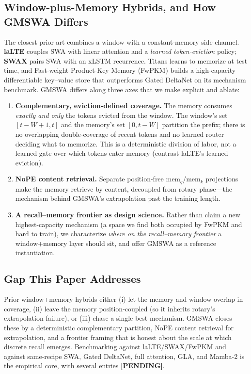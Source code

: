 \documentclass[letterpaper]{article} %
\newcommand{\pending}{\textbf{[PENDING]}}
\begin{document}
\subsection{Window-plus-Memory Hybrids, and How GMSWA Differs}
The closest prior art combines a window with a constant-memory side channel. \textbf{laLTE} \citep{lalte2025} couples SWA with linear attention and a \emph{learned token-eviction} policy; \textbf{SWAX} \citep{swax2025} pairs SWA with an xLSTM recurrence. Titans \citep{titans2025} learns to memorize at test time, and Fast-weight Product-Key Memory (FwPKM) \citep{fwpkm2026} builds a high-capacity differentiable key--value store that outperforms Gated DeltaNet on its mechanism benchmark. GMSWA differs along three axes that we make explicit and ablate:
\begin{enumerate}
  \item \textbf{Complementary, eviction-defined coverage.} The memory consumes \emph{exactly and only} the tokens evicted from the window. The window's set $[t{-}W{+}1, t]$ and the memory's set $[0, t{-}W]$ partition the prefix; there is no overlapping double-coverage of recent tokens and no learned router deciding what to memorize. This is a deterministic division of labor, not a learned gate over which tokens enter memory (contrast laLTE's learned eviction).
  \item \textbf{NoPE content retrieval.} Separate position-free $\mathrm{mem}_q$/$\mathrm{mem}_k$ projections make the memory retrieve by content, decoupled from rotary phase---the mechanism behind GMSWA's extrapolation past the training length.
  \item \textbf{A recall--memory frontier as design science.} Rather than claim a new highest-capacity mechanism (a space we find both occupied by FwPKM and hard to train), we characterize \emph{where on the recall--memory frontier} a window+memory layer should sit, and offer GMSWA as a reference instantiation.
\end{enumerate}

\subsection{Gap This Paper Addresses}
Prior window+memory hybrids either (i) let the memory and window overlap in coverage, (ii) leave the memory position-coupled (so it inherits rotary's extrapolation failure), or (iii) chase a single best mechanism. GMSWA closes these by a deterministic complementary partition, NoPE content retrieval for extrapolation, and a frontier framing that is honest about the scale at which discrete recall emerges. Benchmarking against laLTE/SWAX/FwPKM and against same-recipe SWA, Gated DeltaNet, full attention, GLA, and Mamba-2 is the empirical core, with several entries \pending{}.
\end{document}
